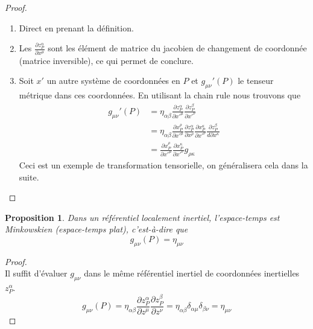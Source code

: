 \documentclass[a4paper,11pt]{report}
\theoremstyle{definition}
\theoremstyle{plain}
\newtheorem{prop}[thm]{Proposition}
\theoremstyle{definition}
\theoremstyle{remark}
\newcommand{\p}{\partial}
\begin{document}
            \begin{proof}
                \begin{enumerate}[label = \textit{\roman*)}]
                    \item Direct en prenant la définition.
                    \item Les $\frac{\p z^\alpha_P}{\p x^\mu}$ sont les élément de matrice du jacobien de changement de coordonnée (matrice inversible), ce qui permet de conclure.
                    \item Soit $x'$ un autre système de coordonnées en $P$ et $g_{\mu\nu}'(P)$ le tenseur métrique dans ces coordonnées. En utilisant la chain rule nous trouvons que
                    \begin{align}
                        g_{\mu\nu}'(P) &= \eta_{\alpha\beta}\frac{\p z^\alpha_P}{ \p x'^\mu}\frac{\p z^\beta_P}{\p x'^\nu}\\
                        &= \eta_{\alpha\beta}\frac{\p x^\rho_P}{ \p x'^\mu}\frac{\p z^\alpha_P}{\p x^\rho}\frac{\p x^\kappa_P}{ \p x'^\nu}\frac{\p z^\beta_P}{d\p x^\kappa} \\
                        &= \frac{\p x^\rho_P}{ \p x'^\mu}\frac{\p x^\kappa_P}{ \p x'^\nu}g_{\rho\kappa}
                    \end{align}
                    Ceci est un exemple de transformation tensorielle, on généralisera cela dans la suite.
                \end{enumerate}
            \end{proof}
            
            \begin{prop}
                Dans un référentiel localement inertiel, l'espace-temps est Minkowskien (espace-temps plat), c'est-à-dire que
                \begin{equation}
                    g_{\mu\nu}(P) = \eta_{\mu\nu}
                \end{equation}
            \end{prop}
            
            \begin{proof}
            ${}$\\
                Il suffit d'évaluer $g_{\mu\nu}$ dans le même référentiel inertiel de coordonnées inertielles $z^\alpha_P$.
                \begin{equation}
                    g_{\mu\nu}(P) = \eta_{\alpha\beta}\frac{\p z^\alpha_P}{ \p z^\mu}\frac{\p z^\beta_P}{\p z^\nu} =  \eta_{\alpha\beta}\delta_{\alpha\mu}\delta_{\beta\nu} = \eta_{\mu\nu}
                \end{equation}
            \end{proof}
            
\end{document}
